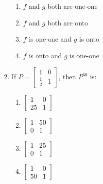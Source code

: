 \documentclass[journal]{IEEEtran}
\begin{document}
\begin{enumerate}
        \begin{enumerate}
        \item $f$ and $g$ both are one-one
        \item $f$ and $g$ both are onto
        \item $f$ is one-one and $g$ is onto
        \item $f$ is onto and $g$ is one-one
        \end{enumerate}

    \item If $P=\begin{bmatrix}1 & 0 \\ \frac{1}{2} & 1\end{bmatrix}$, then $P^{50}$ is:

        \begin{multicols}{4}
        \begin{enumerate}
        \item $\begin{bmatrix}1 & 0 \\ 25 & 1\end{bmatrix}$
        \item $\begin{bmatrix}1 & 50 \\ 0 & 1\end{bmatrix}$
        \item $\begin{bmatrix}1 & 25 \\ 0 & 1\end{bmatrix}$
        \item $\begin{bmatrix}1 & 0 \\ 50 & 1\end{bmatrix}$
        \end{enumerate}
        \end{multicols}
                
\end{enumerate}
\end{document}
